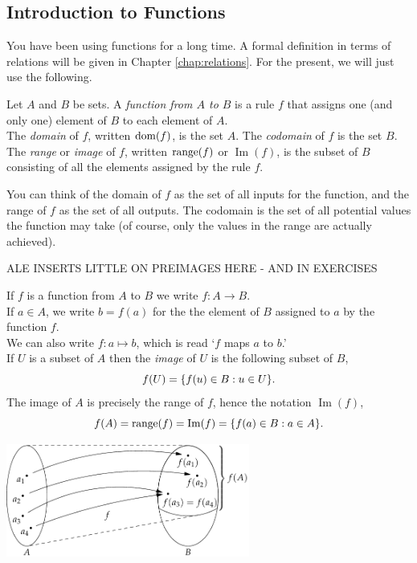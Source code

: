 \subsection{Introduction to Functions}\label{sec:func1}

You have been using functions for a long time. A formal definition in terms of relations will be given in Chapter \ref{chap:relations}. For the present, we will just use the following.

\begin{defn}{}{}
Let $A$ and $B$ be sets. A \emph{function from $A$ to $B$} is a rule $f$ that assigns one (and only one) element of $B$ to each element of $A$.\\
The \emph{domain} of $f$, written $\operatorname{dom}(f)$, is the set $A$. The \emph{codomain} of $f$ is the set $B$.\\
The \emph{range} or \emph{image} of $f$, written $\operatorname{range}(f)$ or $\operatorname{Im}(f)$, is the subset of $B$ consisting of all the elements assigned by the rule $f$.
\end{defn}

 You can think of the domain of $f$ as the set of all inputs for the function, and the range of $f$ as the set of all outputs. The codomain is the set of all potential values the function may take (of course, only the values in the range are actually achieved).

 ALE INSERTS LITTLE ON PREIMAGES HERE - AND IN EXERCISES

If $f$ is a function from $A$ to $B$ we write $f:A\to B$.\\
If $a\in A$, we write $b=f(a)$ for the the element of $B$ assigned to $a$ by the function $f$.\\
We can also write $f:a\mapsto b$, which is read `$f$ maps $a$ to $b$.'\\
If $U$ is a subset of $A$ then the \emph{image} of $U$ is the following subset of $B$,\vspace{-4pt}
\[f(U)=\{f(u)\in B:u\in U\}.\vspace{-5pt}\]
The image of $A$ is precisely the range of $f$, hence the notation $\operatorname{Im}(f)$,\vspace{-4pt}
\[f(A)=\range(f)=\operatorname{Im}(f)=\{f(a)\in B:a\in A\}.\vspace{-2pt}\]


\begin{center}
\includegraphics[width=0.6\textwidth]{sets-16-funcdef}
\end{center}



